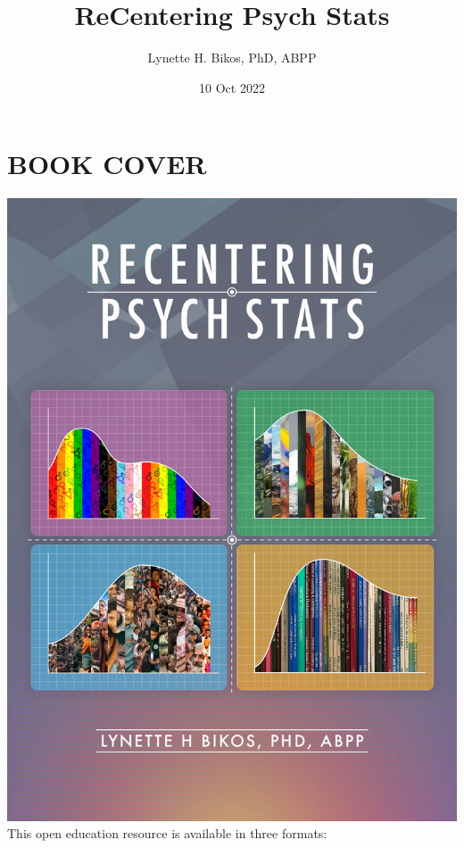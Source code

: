 \documentclass[
  11pt,
]{book}
\title{ReCentering Psych Stats}
\author{Lynette H. Bikos, PhD, ABPP}
\date{10 Oct 2022}
\begin{document}
\maketitle

{
\hypersetup{linkcolor=}
\setcounter{tocdepth}{3}
\tableofcontents
}
\hypertarget{book-cover}{%
\chapter*{BOOK COVER}\label{book-cover}}

\includegraphics{images/ReCenterPsychStats-bookcover2.jpg}
This open education resource is available in three formats:
\end{document}
